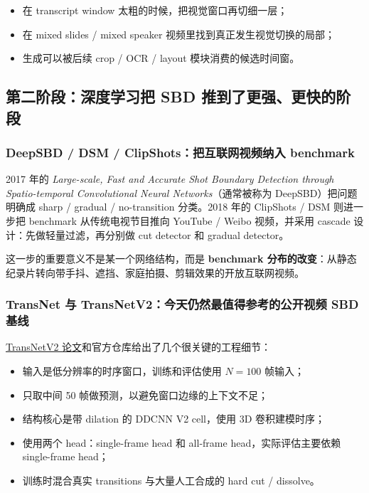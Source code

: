 \documentclass[a4paper]{article}
\begin{document}
\begin{itemize}
\item 在 transcript window 太粗的时候，把视觉窗口再切细一层；
\item 在 mixed slides / mixed speaker 视频里找到真正发生视觉切换的局部；
\item 生成可以被后续 crop / OCR / layout 模块消费的候选时间窗。
\end{itemize}

\subsection{第二阶段：深度学习把 SBD 推到了更强、更快的阶段}

\subsubsection{DeepSBD / DSM / ClipShots：把互联网视频纳入 benchmark}

2017 年的 \textit{Large-scale, Fast and Accurate Shot Boundary Detection through Spatio-temporal Convolutional Neural Networks}（通常被称为 DeepSBD）把问题明确成 sharp / gradual / no-transition 分类。2018 年的 ClipShots / DSM 则进一步把 benchmark 从传统电视节目推向 YouTube / Weibo 视频，并采用 cascade 设计：先做轻量过滤，再分别做 cut detector 和 gradual detector。

这一步的重要意义不是某一个网络结构，而是 \textbf{benchmark 分布的改变}：从静态纪录片转向带手抖、遮挡、家庭拍摄、剪辑效果的开放互联网视频。

\subsubsection{TransNet 与 TransNetV2：今天仍然最值得参考的公开视频 SBD 基线}

\href{https://arxiv.org/abs/2008.04838}{TransNetV2 论文}和官方仓库给出了几个很关键的工程细节：

\begin{itemize}
\item 输入是低分辨率的时序窗口，训练和评估使用 $N=100$ 帧输入；
\item 只取中间 50 帧做预测，以避免窗口边缘的上下文不足；
\item 结构核心是带 dilation 的 DDCNN V2 cell，使用 3D 卷积建模时序；
\item 使用两个 head：single-frame head 和 all-frame head，实际评估主要依赖 single-frame head；
\item 训练时混合真实 transitions 与大量人工合成的 hard cut / dissolve。
\end{itemize}
\end{document}
